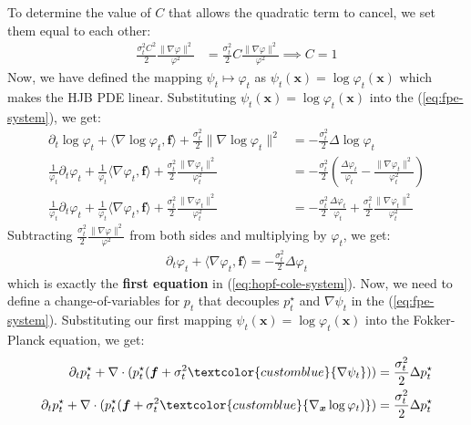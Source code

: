 \documentclass{article}
\newcommand{\bluetext}[1]{\textcolor{customblue}{#1}}
\begin{document}
To determine the value of $C$ that allows the quadratic term to cancel, we set them equal to each other:
\begin{align}
    \frac{\sigma_t^2C^2}{2}\frac{\|\nabla\varphi\|^2 }{\varphi^2}&=\frac{\sigma_t^2}{2} C\frac{\|\nabla \varphi\|^2 }{\varphi^2}\implies  C=1
\end{align}
Now, we have defined the mapping $\psi_t\mapsto \varphi_t$ as $\psi_t(\boldsymbol{x})=\log\varphi_t(\boldsymbol{x})$ which makes the HJB PDE linear. Substituting $\psi_t(\boldsymbol{x})=\log\varphi_t(\boldsymbol{x})$ into the (\ref{eq:fpe-system}), we get:
\begin{align}
    \partial_t\log\varphi_t+\langle\nabla\log \varphi_t, \boldsymbol{f}\rangle +\frac{\sigma_t^2}{2}\|\nabla \log \varphi_t\|^2&=-\frac{\sigma_t^2}{2}\Delta \log \varphi_t\nonumber\\
    \frac{1}{\varphi_t}\partial_t \varphi_t+\frac{1}{\varphi_t}\langle\nabla \varphi_t, \boldsymbol{f}\rangle +\frac{\sigma_t^2}{2}\frac{\|\nabla \varphi_t\|^2}{\varphi_t^2}&=-\frac{\sigma_t^2}{2}\left(\frac{\Delta \varphi_t}{\varphi_t}-\frac{\|\nabla \varphi_t\|^2}{\varphi_t^2}\right)\nonumber\\
    \frac{1}{\varphi_t}\partial_t \varphi_t+\frac{1}{\varphi_t}\langle\nabla \varphi_t, \boldsymbol{f}\rangle  +\frac{\sigma_t^2}{2}\frac{\|\nabla \varphi_t\|^2}{\varphi_t^2}&=-\frac{\sigma_t^2}{2}\frac{\Delta \varphi_t}{\varphi_t}+\frac{\sigma_t^2}{2}\frac{\|\nabla \varphi_t\|^2}{\varphi_t^2}
\end{align}
Subtracting $\frac{\sigma_t^2}{2}\frac{\|\nabla \varphi\|^2}{\varphi^2}$ from both sides and multiplying by $\varphi_t$, we get:
\begin{align}
    \partial_t \varphi_t+\langle\nabla \varphi_t, \boldsymbol{f}\rangle =-\frac{\sigma_t^2}{2} \Delta \varphi_t
\end{align}
which is exactly the \textbf{first equation} in (\ref{eq:hopf-cole-system}). Now, we need to define a change-of-variables for $p_t$ that decouples $p_t^\star$ and $\nabla\psi_t$ in the (\ref{eq:fpe-system}). Substituting our first mapping $\psi_t(\boldsymbol{x})=\log\varphi_t(\boldsymbol{x})$ into the Fokker-Planck equation, we get:
\begin{align}
    \partial_t p^\star_t+\nabla\cdot (p^\star_t(\boldsymbol{f}+\sigma_t^2\bluetext{\nabla \psi_t}))&=\frac{\sigma_t^2}{2} \Delta p^\star_t\nonumber\\
    \partial_t p^\star_t+\nabla\cdot (p^\star_t(\boldsymbol{f}+\sigma^2_t\bluetext{\nabla _{\boldsymbol{x}} \log\varphi_t)})&=\frac{\sigma_t^2}{2} \Delta p^\star_t
\end{align}
\end{document}
